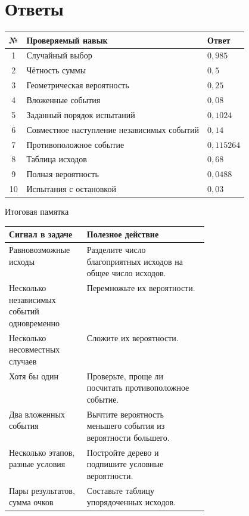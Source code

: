 \documentclass[a4paper,12pt]{article}
\begin{document}
\section*{Ответы}
\begin{center}
\renewcommand{\arraystretch}{1.5}
\begin{tabularx}{0.94\linewidth}{@{}c X l@{}}
\toprule
№ & Проверяемый навык & Ответ \\\midrule
1 & Случайный выбор & $0,985$ \\
2 & Чётность суммы & $0,5$ \\
3 & Геометрическая вероятность & $0,25$ \\
4 & Вложенные события & $0,08$ \\
5 & Заданный порядок испытаний & $0,1024$ \\
6 & Совместное наступление независимых событий & $0,14$ \\
7 & Противоположное событие & $0,115264$ \\
8 & Таблица исходов & $0,68$ \\
9 & Полная вероятность & $0,0488$ \\
10 & Испытания с остановкой & $0,03$ \\
\bottomrule
\end{tabularx}
\end{center}
\vspace{8mm}
\textcolor{darkaccent}{\large Итоговая памятка}
\begin{center}
\renewcommand{\arraystretch}{1.35}
\begin{tabularx}{\linewidth}{@{}p{0.39\linewidth}X@{}}
\toprule
Сигнал в задаче & Полезное действие \\\midrule
Равновозможные исходы & Разделите число благоприятных исходов на общее число исходов. \\
Несколько независимых событий одновременно & Перемножьте их вероятности. \\
Несколько несовместных случаев & Сложите их вероятности. \\
Хотя бы один & Проверьте, проще ли посчитать противоположное событие. \\
Два вложенных события & Вычтите вероятность меньшего события из вероятности большего. \\
Несколько этапов, разные условия & Постройте дерево и подпишите условные вероятности. \\
Пары результатов, сумма очков & Составьте таблицу упорядоченных исходов. \\
\bottomrule
\end{tabularx}
\end{center}
\end{document}
